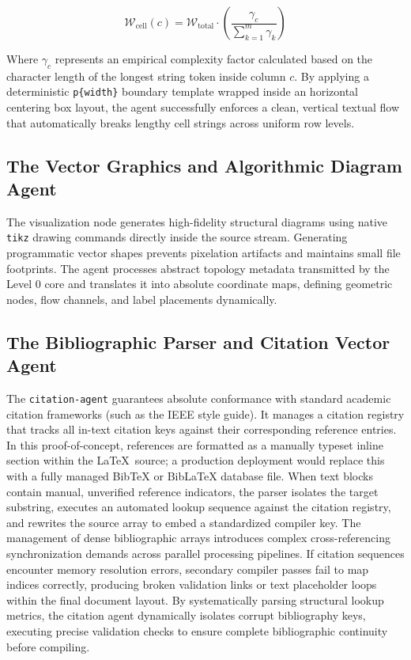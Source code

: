 $$ \mathcal{W}_{\text{cell}}(c) = \mathcal{W}_{\text{total}} \cdot \left( \frac{\gamma_c}{\sum_{k=1}^{m} \gamma_k} \right) $$

Where \(\gamma_c\) represents an empirical complexity factor calculated based on the character length of the longest string token inside column \(c\). By applying a deterministic \texttt{p\{width\}} boundary template wrapped inside an horizontal centering box layout, the agent successfully enforces a clean, vertical textual flow that automatically breaks lengthy cell strings across uniform row levels.

\subsection{The Vector Graphics and Algorithmic Diagram Agent}
The visualization node generates high-fidelity structural diagrams using native \texttt{tikz} drawing commands directly inside the source stream. Generating programmatic vector shapes prevents pixelation artifacts and maintains small file footprints. The agent processes abstract topology metadata transmitted by the Level 0 core and translates it into absolute coordinate maps, defining geometric nodes, flow channels, and label placements dynamically.

\subsection{The Bibliographic Parser and Citation Vector Agent}
The \texttt{citation-agent} guarantees absolute conformance with standard academic citation frameworks (such as the IEEE style guide). It manages a citation registry that tracks all in-text citation keys against their corresponding reference entries. In this proof-of-concept, references are formatted as a manually typeset inline section within the \LaTeX\ source; a production deployment would replace this with a fully managed BibTeX or BibLaTeX database file. When text blocks contain manual, unverified reference indicators, the parser isolates the target substring, executes an automated lookup sequence against the citation registry, and rewrites the source array to embed a standardized compiler key. The management of dense bibliographic arrays introduces complex cross-referencing synchronization demands across parallel processing pipelines. If citation sequences encounter memory resolution errors, secondary compiler passes fail to map indices correctly, producing broken validation links or text placeholder loops within the final document layout. By systematically parsing structural lookup metrics, the citation agent dynamically isolates corrupt bibliography keys, executing precise validation checks to ensure complete bibliographic continuity before compiling.

